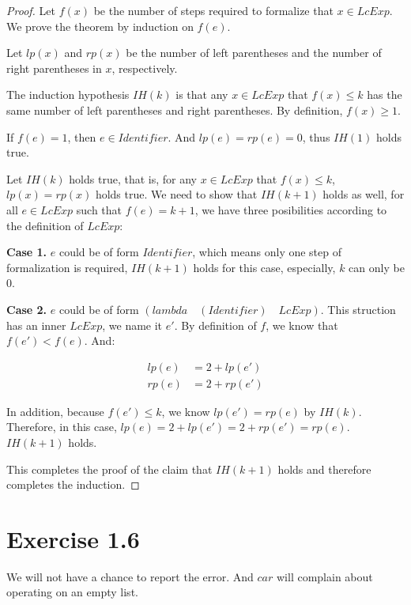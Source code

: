 \documentclass[11pt,a4paper]{article}
\begin{document}
\begin{proof}
    Let $f(x)$ be the number of steps required to formalize that $x \in LcExp$.
    We prove the theorem by induction on $f(e)$.

    Let $lp(x)$ and $rp(x)$ be the number of left parentheses and the number
    of right parentheses in $x$, respectively.

    The induction hypothesis $IH(k)$ is that
    any $x \in LcExp$ that $f(x) \le k$ has the same number of
    left parentheses and right parentheses.  By definition, $f(x) \ge 1$. 

    If $f(e) = 1$, then $e \in Identifier$.
    And $lp(e) = rp(e) = 0$, thus $IH(1)$ holds true.

    Let $IH(k)$ holds true, that is,
    for any $x \in LcExp$ that $f(x) \le k$,
    $lp(x) = rp(x)$ holds true.
    We need to show that $IH(k+1)$ holds as well,
    for all $e \in LcExp$ such that $f(e) = k+1$,
    we have three posibilities according to the definition of $LcExp$:

    \textbf{Case 1.} $e$ could be of form $Identifier$, which means only one
    step of formalization is required, $IH(k+1)$ holds for this case,
    especially, $k$ can only be $0$.

    \textbf{Case 2.} $e$ could be of form
    $(lambda \quad (Identifier) \quad LcExp)$. This struction has
    an inner $LcExp$, we name it $e'$. By definition of $f$,
    we know that $f(e') < f(e)$. And:

    \begin{align*}
        lp(e) & = 2 + lp(e') \\
        rp(e) & = 2 + rp(e')
    \end{align*}

    In addition, because $f(e') \le k$, we know $lp(e') = rp(e)$ by $IH(k)$.
    Therefore, in this case, $lp(e) = 2 + lp(e') = 2 + rp(e') = rp(e)$.
    $IH(k+1)$ holds.

    This completes the proof of the claim that $IH(k+1)$ holds and therefore
    completes the induction.

\end{proof}

\section{Exercise 1.6}

We will not have a chance to report the error.
And $car$ will complain about operating on an empty list.
\end{document}
